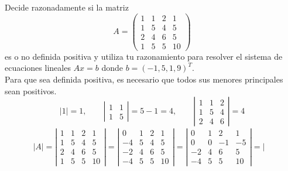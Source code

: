 \begin{ejercicio}
    Decide razonadamente si la matriz
    $$A = \left( \begin{array}{cccc}
        1 & 1 & 2 & 1 \\
        1 & 5 & 4 & 5 \\
        2 & 4 & 6 & 5 \\
        1 & 5 & 5 & 10
    \end{array} \right)$$
    es o no definida positiva y utiliza tu razonamiento para resolver el sistema de ecuaciones lineales $Ax = b$ donde $b=(-1,5,1,9)^T$.\\

    Para que sea definida positiva, es necesario que todos sus menores principales sean positivos.
    \begin{equation*}
        |1| = 1, \qquad
        \left| \begin{array}{cc}
            1 & 1 \\
            1 & 5
        \end{array} \right| = 5-1=4,\qquad
        \left| \begin{array}{ccc}
            1 & 1 & 2\\
            1 & 5 & 4\\
            2 & 4 & 6
        \end{array} \right|=4
    \end{equation*}
    \begin{multline*}
    |A| = \left| \begin{array}{cccc}
        1 & 1 & 2 & 1 \\
        1 & 5 & 4 & 5 \\
        2 & 4 & 6 & 5 \\
        1 & 5 & 5 & 10
    \end{array} \right| = \left| \begin{array}{cccc}
        0 & 1 & 2 & 1 \\
        -4 & 5 & 4 & 5 \\
        -2 & 4 & 6 & 5 \\
        -4 & 5 & 5 & 10
    \end{array} \right| = \left| \begin{array}{cccc}
        0 & 1 & 2 & 1 \\
        0 & 0 & -1 & -5 \\
        -2 & 4 & 6 & 5 \\
        -4 & 5 & 5 & 10
    \end{array} \right| = 
    \left| \begin{array}{cccc}

\end{array}
\end{multline*}
\end{ejercicio}
